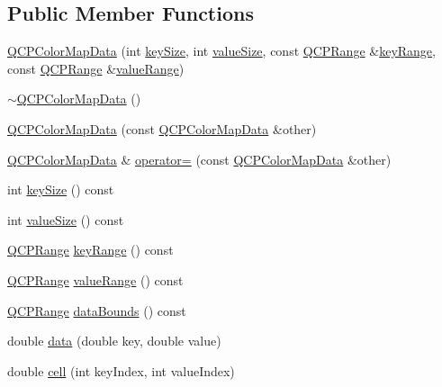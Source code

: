 \subsection*{Public Member Functions}
\begin{DoxyCompactItemize}
\item 
\hyperlink{classQCPColorMapData_aac9d8eb81e18e240d89d56c01933fd23}{Q\+C\+P\+Color\+Map\+Data} (int \hyperlink{classQCPColorMapData_aa8d7811686fdfea964947715210c4af8}{key\+Size}, int \hyperlink{classQCPColorMapData_ab880be6bc587f34e8d22fe77ef6b57e9}{value\+Size}, const \hyperlink{classQCPRange}{Q\+C\+P\+Range} \&\hyperlink{classQCPColorMapData_a4765180639742460f64ab6c97c745c08}{key\+Range}, const \hyperlink{classQCPRange}{Q\+C\+P\+Range} \&\hyperlink{classQCPColorMapData_a025be4d7ba0494fd7b38a5a56c737f2a}{value\+Range})
\item 
\hyperlink{classQCPColorMapData_a7ac252031d0921520d5bccb6bfa23a8b}{$\sim$\+Q\+C\+P\+Color\+Map\+Data} ()
\item 
\hyperlink{classQCPColorMapData_a7f2145d86473263494abb9bf1de20436}{Q\+C\+P\+Color\+Map\+Data} (const \hyperlink{classQCPColorMapData}{Q\+C\+P\+Color\+Map\+Data} \&other)
\item 
\hyperlink{classQCPColorMapData}{Q\+C\+P\+Color\+Map\+Data} \& \hyperlink{classQCPColorMapData_afdf4dd1b2f5714234fe84709b85c2a8d}{operator=} (const \hyperlink{classQCPColorMapData}{Q\+C\+P\+Color\+Map\+Data} \&other)
\item 
int \hyperlink{classQCPColorMapData_aa8d7811686fdfea964947715210c4af8}{key\+Size} () const 
\item 
int \hyperlink{classQCPColorMapData_ab880be6bc587f34e8d22fe77ef6b57e9}{value\+Size} () const 
\item 
\hyperlink{classQCPRange}{Q\+C\+P\+Range} \hyperlink{classQCPColorMapData_a4765180639742460f64ab6c97c745c08}{key\+Range} () const 
\item 
\hyperlink{classQCPRange}{Q\+C\+P\+Range} \hyperlink{classQCPColorMapData_a025be4d7ba0494fd7b38a5a56c737f2a}{value\+Range} () const 
\item 
\hyperlink{classQCPRange}{Q\+C\+P\+Range} \hyperlink{classQCPColorMapData_a9ff433248ee226ea0c469ae6cc2489fd}{data\+Bounds} () const 
\item 
double \hyperlink{classQCPColorMapData_a2c33807b008cdb9e1394245c294c0eaf}{data} (double key, double value)
\item 
double \hyperlink{classQCPColorMapData_af51ecd21f347adbf87b4cce4e1f5cbd6}{cell} (int key\+Index, int value\+Index)

\end{DoxyCompactItemize}
